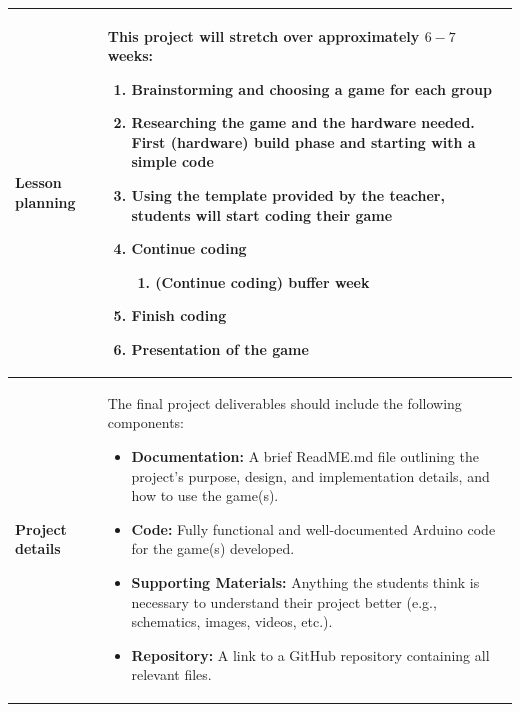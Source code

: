 \documentclass[10pt]{article}
\begin{document}
\begin{longtable}{|p{3.5cm}|p{11cm}|}
  \textbf{Lesson planning} & 
  This project will stretch over approximately $6-7$ weeks:
  \begin{enumerate}
    \item Brainstorming and choosing a game for each group
    \item Researching the game and the hardware needed. First (hardware) build phase and starting with a simple code
    \item Using the template provided by the teacher, students will start coding their game
    \item Continue coding
    \begin{enumerate}
      \item (Continue coding) buffer week
    \end{enumerate}
    \item Finish coding
    \item Presentation of the game
  \end{enumerate}
  \\ \hline
  \textbf{Project details} & 
The final project deliverables should include the following components:
\begin{itemize}
    \item \textbf{Documentation:} A brief ReadME.md file outlining the project's purpose, design, and implementation details, and how to use the game(s).
    \item \textbf{Code:} Fully functional and well-documented Arduino code for the game(s) developed.
    \item \textbf{Supporting Materials:} Anything the students think is necessary to understand their project better (e.g., schematics, images, videos, etc.).
    \item \textbf{Repository:} A link to a GitHub repository containing all relevant files.
\end{itemize}
\\ \hline

\end{longtable}
\end{document}
